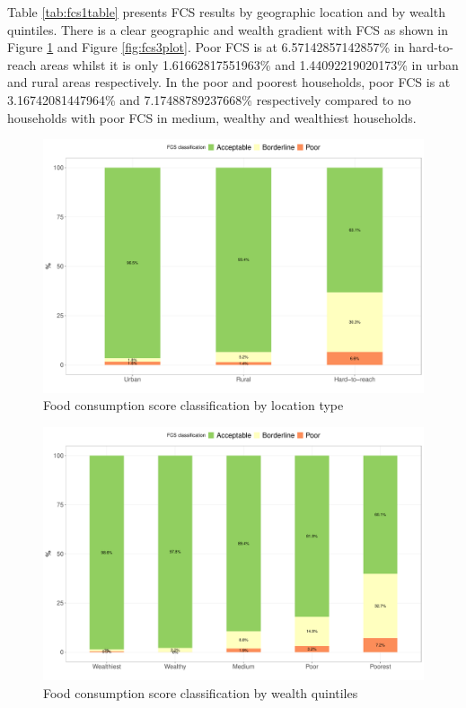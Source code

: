 \documentclass[12pt,a4paper]{article}
\begin{document}
Table \ref{tab:fcs1table} presents FCS results by geographic location and by wealth quintiles. There is a clear geographic and wealth gradient with FCS as shown in Figure \ref{fig:fcs1plot} and Figure \ref{fig:fcs3plot}. Poor FCS is at 6.57142857142857\% in hard-to-reach areas whilst it is only 1.61662817551963\% and 1.44092219020173\% in urban and rural areas respectively. In the poor and poorest households, poor FCS is at 3.16742081447964\% and 7.17488789237668\% respectively compared to no households with poor FCS in medium, wealthy and wealthiest households.

\newpage

\begin{figure}[H]

{\centering \includegraphics{kayinReport_files/figure-latex/fcs1plot-1} 

}

\caption{Food consumption score classification by location type}\label{fig:fcs1plot}
\end{figure}

\begin{figure}[H]

{\centering \includegraphics{kayinReport_files/figure-latex/fcs2plot-1} 

}

\caption{Food consumption score classification by wealth quintiles}\label{fig:fcs2plot}
\end{figure}
\end{document}
